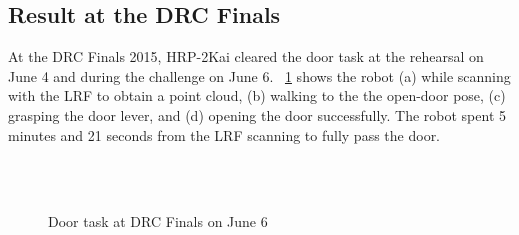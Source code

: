 \subsection{Result at the DRC Finals}
%
At the DRC Finals 2015, HRP-2Kai cleared the door task at the rehearsal on June 4 and during
the challenge on June 6.
\figurename~\ref{fig:drc_door_aist_day2} shows the robot (a) while scanning with the LRF to
obtain a point cloud, (b) walking to the the open-door pose, (c) grasping the door lever,
and (d) opening the door successfully.
The robot spent 5 minutes and 21 seconds from the LRF scanning to fully pass the door.
%
\begin{figure}[t]
	\centering
	\quad
	\\
	\quad
	\\
	\caption{Door task at DRC Finals on June 6~\cite{DARPA}}
	\label{fig:drc_door_aist_day2}
\end{figure}


